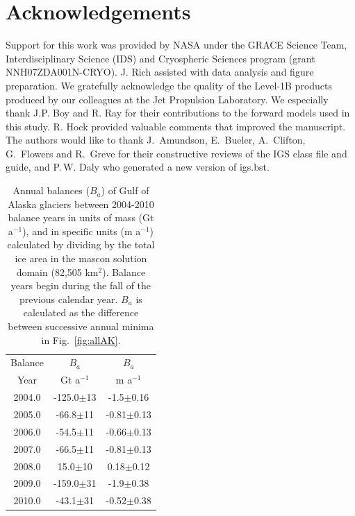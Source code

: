 \documentclass[review]{igs}
\begin{document}
\section{Acknowledgements}

Support for this work was provided by NASA under the GRACE Science Team, Interdisciplinary Science (IDS) and Cryospheric Sciences program (grant NNH07ZDA001N-CRYO). J. Rich assisted with data analysis and figure preparation. We gratefully acknowledge the quality of the Level-1B products produced by our colleagues at the Jet Propulsion Laboratory. We especially thank J.P. Boy and R. Ray for their contributions to the forward models used in this study. R. Hock provided valuable comments that improved the manuscript. The authors would like to thank J.~Amundson, E.~Bueler, A.~Clifton, G.~Flowers and R.~Greve for their constructive reviews of the IGS class file and guide, and P.\,W. Daly who generated a new version of igs.bst.




\vspace{5in}
\begin{table}
\caption{Annual balances ($B_a$) of Gulf of Alaska glaciers between 2004-2010 balance years in units of mass (Gt a$^{-1}$), and in specific units (m a$^{-1}$) calculated by dividing by the total ice area in the mascon solution domain (82,505 km$^{2}$). Balance years begin during the fall of the previous calendar year. $B_a$ is calculated as the difference between successive annual minima in Fig.~\ref{fig:allAK}.}\label{tab:GRACEbals}
\centering
\begin{tabular}{ccc}\hline
Balance & $B_a$ & $B_a$  \\
Year &  Gt a$^{-1}$ & m a$^{-1}$ \\[5pt]
2004.0 & -125.0$\pm$13 & -1.5$\pm$0.16 \\
2005.0 & -66.8$\pm$11 & -0.81$\pm$0.13 \\
2006.0 & -54.5$\pm$11 & -0.66$\pm$0.13 \\
2007.0 & -66.5$\pm$11 & -0.81$\pm$0.13 \\
2008.0 & 15.0$\pm$10 & 0.18$\pm$0.12 \\
2009.0 & -159.0$\pm$31 & -1.9$\pm$0.38 \\
2010.0 & -43.1$\pm$31 & -0.52$\pm$0.38 \\
\hline

\end{tabular}
\end{table}
\end{document}
